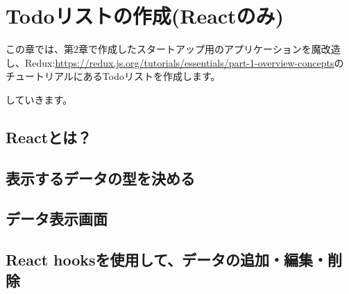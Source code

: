 \chapter{Todoリストの作成(Reactのみ)}
\label{chap:03-todo-with-react}
\begin{starterabstract}
  この章では、第2章で作成したスタートアップ用のアプリケーションを魔改造し、Redux:\url{https://redux.js.org/tutorials/essentials/part-1-overview-concepts}の
  チュートリアルにあるTodoリストを作成します。



  していきます。
\end{starterabstract}

\section{Reactとは？}
\keeplastskip{
  \label{sec:3-1}
  \label{sec-031React}
  \par\nobreak
}

\section{表示するデータの型を決める}
\keeplastskip{
  \label{sec:3-2}
  \label{sec-032UIDataType}
  \par\nobreak
}

\section{データ表示画面}
\keeplastskip{
  \label{sec:3-3}
  \label{sec-033UI}
  \par\nobreak
}

\section{React hooksを使用して、データの追加・編集・削除}
\keeplastskip{
  \label{sec:3-4}
  \label{sec-034hooks}
  \par\nobreak
}
